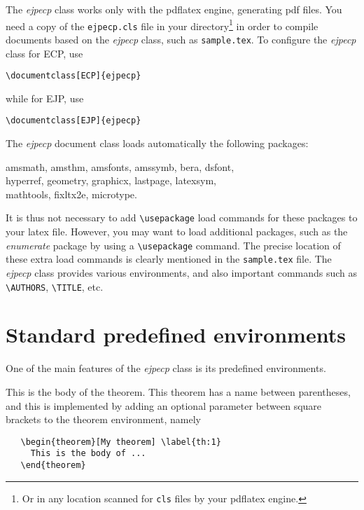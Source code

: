 \documentclass[ECP]{ejpecp} %
\begin{document}
The \emph{ejpecp} class works only with the pdflatex engine, generating pdf
files. You need a copy of the \texttt{ejpecp.cls} file in your
directory\footnote{Or in any location scanned for \texttt{cls} files by your
  pdflatex engine.} in order to compile documents based on the \emph{ejpecp}
class, such as \texttt{sample.tex}. To configure the \emph{ejpecp} class for
ECP, use
\begin{verbatim}
\documentclass[ECP]{ejpecp}
\end{verbatim}
while for EJP, use
\begin{verbatim}
\documentclass[EJP]{ejpecp}
\end{verbatim}
The \emph{ejpecp} document class loads automatically the following packages:
\begin{center}
  \ttfamily
  amsmath, amsthm, amsfonts, amssymb, bera, dsfont, \\
  hyperref, geometry, graphicx, lastpage, latexsym, \\
  mathtools, fixltx2e, microtype.
\end{center}
It is thus not necessary to add \verb+\usepackage+ load commands for
these packages to your latex file. However, you may want to load additional
packages, such as the \emph{enumerate} package by using a \verb+\usepackage+
command. The precise location of these extra load commands is clearly
mentioned in the \texttt{sample.tex} file. The \emph{ejpecp} class provides
various environments, and also important commands such as \verb+\AUTHORS+,
\verb+\TITLE+, etc.

\section{Standard predefined environments}

One of the main features of the \emph{ejpecp} class is its predefined
environments.

 \begin{theorem}[My theorem]\label{th:1}
   This is the body of the theorem. This theorem has a name between
   parentheses, and this is implemented by adding an optional parameter
   between square brackets to the theorem environment, namely
\begin{verbatim}
   \begin{theorem}[My theorem] \label{th:1}
     This is the body of ...
   \end{theorem}
\end{verbatim}
 \end{theorem}
\end{document}
